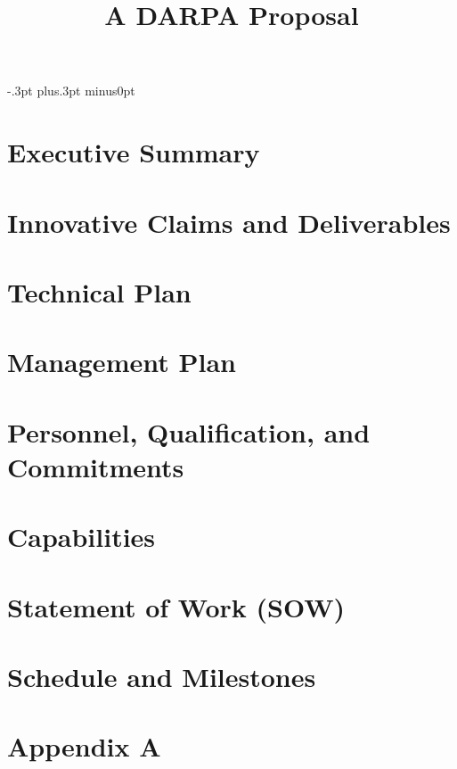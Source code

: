 \documentclass[12pt,letterpaper]{article}
\title{A DARPA Proposal}
\date{}
\begin{document}
\advance\baselineskip-.3pt plus.3pt minus0pt


\newpage


\tableofcontents
\pagebreak



\section{Executive Summary}


\section{Innovative Claims and Deliverables}


\section{Technical Plan}


\section{Management Plan}
\label{management-plan}


\section{Personnel, Qualification, and Commitments}
\label{sec:qualifications}


\section{Capabilities}


\section{Statement of Work (SOW)}


\pagebreak
\section{Schedule and Milestones}


\pagebreak

\appendix

\section{Appendix A}


\patchcmd{\thebibliography}{\section*}{\section}{}{}


\end{document}
